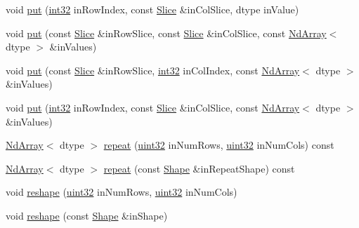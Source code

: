 \begin{DoxyCompactItemize}
\item 
void \mbox{\hyperlink{class_num_c_1_1_nd_array_a2ee8abf9530df801c091cc6ed7c4fe89}{put}} (\mbox{\hyperlink{namespace_num_c_aa5a7e69266097d55816d4cdb19542b53}{int32}} in\+Row\+Index, const \mbox{\hyperlink{class_num_c_1_1_slice}{Slice}} \&in\+Col\+Slice, dtype in\+Value)
\item 
void \mbox{\hyperlink{class_num_c_1_1_nd_array_a0f02539960c15a726e69dfefade76986}{put}} (const \mbox{\hyperlink{class_num_c_1_1_slice}{Slice}} \&in\+Row\+Slice, const \mbox{\hyperlink{class_num_c_1_1_slice}{Slice}} \&in\+Col\+Slice, const \mbox{\hyperlink{class_num_c_1_1_nd_array}{Nd\+Array}}$<$ dtype $>$ \&in\+Values)
\item 
void \mbox{\hyperlink{class_num_c_1_1_nd_array_a0ac10180b5ea5aed6c044012e74ca4fe}{put}} (const \mbox{\hyperlink{class_num_c_1_1_slice}{Slice}} \&in\+Row\+Slice, \mbox{\hyperlink{namespace_num_c_aa5a7e69266097d55816d4cdb19542b53}{int32}} in\+Col\+Index, const \mbox{\hyperlink{class_num_c_1_1_nd_array}{Nd\+Array}}$<$ dtype $>$ \&in\+Values)
\item 
void \mbox{\hyperlink{class_num_c_1_1_nd_array_a13f162dc541b9dcad9e38e00afe0ab02}{put}} (\mbox{\hyperlink{namespace_num_c_aa5a7e69266097d55816d4cdb19542b53}{int32}} in\+Row\+Index, const \mbox{\hyperlink{class_num_c_1_1_slice}{Slice}} \&in\+Col\+Slice, const \mbox{\hyperlink{class_num_c_1_1_nd_array}{Nd\+Array}}$<$ dtype $>$ \&in\+Values)
\item 
\mbox{\hyperlink{class_num_c_1_1_nd_array}{Nd\+Array}}$<$ dtype $>$ \mbox{\hyperlink{class_num_c_1_1_nd_array_a2314d88fd8d3c7adb25bc1331996d248}{repeat}} (\mbox{\hyperlink{namespace_num_c_ae685802ca6d3035f2b400b081e3953fa}{uint32}} in\+Num\+Rows, \mbox{\hyperlink{namespace_num_c_ae685802ca6d3035f2b400b081e3953fa}{uint32}} in\+Num\+Cols) const
\item 
\mbox{\hyperlink{class_num_c_1_1_nd_array}{Nd\+Array}}$<$ dtype $>$ \mbox{\hyperlink{class_num_c_1_1_nd_array_afe4566bcc50f89abad438ff8606dc735}{repeat}} (const \mbox{\hyperlink{class_num_c_1_1_shape}{Shape}} \&in\+Repeat\+Shape) const
\item 
void \mbox{\hyperlink{class_num_c_1_1_nd_array_a55fbd9259848930ce641e62069c82bce}{reshape}} (\mbox{\hyperlink{namespace_num_c_ae685802ca6d3035f2b400b081e3953fa}{uint32}} in\+Num\+Rows, \mbox{\hyperlink{namespace_num_c_ae685802ca6d3035f2b400b081e3953fa}{uint32}} in\+Num\+Cols)
\item 
void \mbox{\hyperlink{class_num_c_1_1_nd_array_a12296c59b04435b329317d2137c5e86e}{reshape}} (const \mbox{\hyperlink{class_num_c_1_1_shape}{Shape}} \&in\+Shape)

\end{DoxyCompactItemize}
